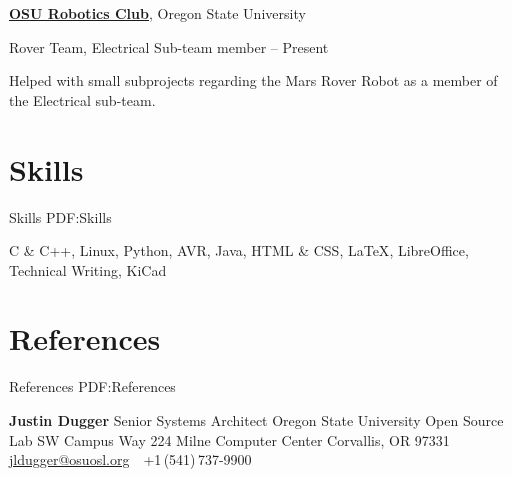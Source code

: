 \documentclass[letterpaper,MMMyyyy,nonstop]{simpleresumecv}
\begin{document}
\begin{body}
\href{http://osurobotics.club}
{\textbf{OSU Robotics Club}},
Oregon State University

\GapNoBreak
\BulletItem
Rover Team, Electrical Sub-team member
\hfill
{} --
Present
\begin{detail}
\SubBulletItem
Helped with small subprojects regarding the Mars Rover Robot as a member of the Electrical sub-team.
\end{detail}

\fi


\iffalse

\section
{Other Work\newline
Experience}
{Other Work Experience}
{PDF:OtherWorkExperience}

\textbf{Wilsonville High School},
Wilsonville, Oregon, USA

\GapNoBreak
\BulletItem
Teacher's Aide,
Computer Science \& Conceptual Physics
\hfill
\DatestampYMD{2015}{01}{15} --
\DatestampYMD{2015}{06}{06}
\begin{detail}
\SubBulletItem
Assisted students with problem solving methods in AP Computer Science A and Conceptual Physics courses; demonstrated physical concepts through examples and assisted with carrying out lab activities.
\end{detail}

\fi


\section
{Skills}
{Skills}
{PDF:Skills}

C \& C++,
Linux,
Python,
AVR,
Java,
HTML \& CSS,
{\LaTeX},
LibreOffice,
Technical Writing,
KiCad


\iffalse

\section
{References}
{References}
{PDF:References}

\Gap
\BulletItem
\textbf{Justin Dugger}
\newline
Senior Systems Architect
\newline
Oregon State University Open Source Lab
 SW Campus Way
224 Milne Computer Center
Corvallis, OR 97331
\newline
\href{mailto:jldugger@osuosl.org}
{jldugger@osuosl.org}
\,\SubBulletSymbol\,
+1\,(541)\,737-9900


\end{body}
\end{document}

